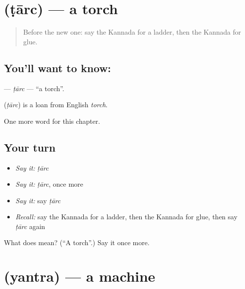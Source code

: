 \section[\texorpdfstring{\kn{ಟಾರ್ಚ್} (ṭārc)}{ಟಾರ್ಚ್ (ṭārc)}]{ (ṭārc) — a torch}

\label{lesson:KA-C227-tarc}



\begin{quote}
Before the new one: say the Kannada for a ladder, then the Kannada for glue.
\end{quote}

\subsection*{You'll want to know: }
\textbf{} — \emph{ṭārc} — \textquotedblleft{}a torch\textquotedblright{}.

\begin{cousinweb}
\textbf{} (\emph{ṭārc}) is a loan from English \emph{torch}.
\end{cousinweb}

\begin{grammarlens}[title={What you've built}]
One more word for this chapter.
\end{grammarlens}

\subsection*{Your turn}
\begin{itemize}
\raggedright
  \item \emph{Say it:} \emph{ṭārc}
  \item \emph{Say it:} \emph{ṭārc}, once more
  \item \emph{Say it:} say \emph{ṭārc}
  \item \emph{Recall:} say the Kannada for a ladder, then the Kannada for glue, then say \emph{ṭārc} again
\end{itemize}

\begin{tcolorbox}[breakable,colback=teal!4,colframe=teal!35!black,title={Before you move on}]
What does  mean? (\textquotedblleft{}A torch\textquotedblright{}.) Say it once more.
\end{tcolorbox}
\section[\texorpdfstring{\kn{ಯಂತ್ರ} (yantra)}{ಯಂತ್ರ (yantra)}]{ (yantra) — a machine}

